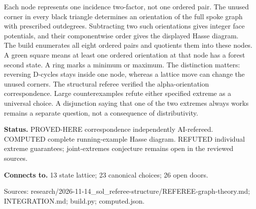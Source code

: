 \documentclass[10pt,a4paper]{amsart}
\begin{document}
Each node represents one incidence two-factor, not one ordered pair. The unused corner in every black triangle determines an orientation of the full spoke graph with prescribed outdegrees. Subtracting two such orientations gives integer face potentials, and their componentwise order gives the displayed Hasse diagram. The build enumerates all eight ordered pairs and quotients them into these nodes. A green square means at least one ordered orientation at that node has a forest second state. A ring marks a minimum or maximum. The distinction matters: reversing D-cycles stays inside one node, whereas a lattice move can change the unused corners. The structural referee verified the alpha-orientation correspondence. Large counterexamples refute either specified extreme as a universal choice. A disjunction saying that one of the two extremes always works remains a separate question, not a consequence of distributivity.

\textbf{Status.} PROVED-HERE correspondence independently AI-refereed. COMPUTED complete running-example Hasse diagram. REFUTED individual extreme guarantees; joint-extremes conjecture remains open in the reviewed sources.

\textbf{Connects to.} 13 state lattice; 23 canonical choices; 26 open doors.

{\footnotesize\raggedright Sources: research/\allowbreak{}2026-11-14\_sol\_referee-structure/\allowbreak{}REFEREE-graph-theory.md;\allowbreak{} INTEGRATION.md;\allowbreak{} build.py;\allowbreak{} computed.json.\par}
\end{document}
